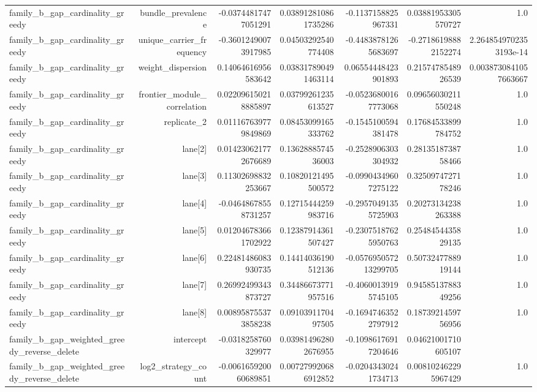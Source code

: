 {\begin{longtable}{lrrrrrr}
family\_b\_gap\_cardinality\_greedy & bundle\_prevalence & -0.03744817477051291 & 0.038912810861735286 & -0.1137158825967331 & 0.03881953305570727 & 1.0 \\
family\_b\_gap\_cardinality\_greedy & unique\_carrier\_frequency & -0.36012490073917985 & 0.04503292540774408 & -0.44838781265683697 & -0.27186198882152274 & 2.2648549702353193e-14 \\
family\_b\_gap\_cardinality\_greedy & weight\_dispersion & 0.14064616956583642 & 0.038317890491463114 & 0.06554448423901893 & 0.2157478548926539 & 0.0038730841057663667 \\
family\_b\_gap\_cardinality\_greedy & frontier\_module\_correlation & 0.022096150218885897 & 0.03799261235613527 & -0.05236800167773068 & 0.09656030211550248 & 1.0 \\
family\_b\_gap\_cardinality\_greedy & replicate\_2 & 0.011167639779849869 & 0.08453099165333762 & -0.1545100594381478 & 0.17684533899784752 & 1.0 \\
family\_b\_gap\_cardinality\_greedy & lane[2] & 0.014230621772676689 & 0.1362888574536003 & -0.2528906303304932 & 0.2813518738758466 & 1.0 \\
family\_b\_gap\_cardinality\_greedy & lane[3] & 0.11302698832253667 & 0.10820121495500572 & -0.09904349607275122 & 0.3250974727178246 & 1.0 \\
family\_b\_gap\_cardinality\_greedy & lane[4] & -0.04648678558731257 & 0.12715444259983716 & -0.29570491355725903 & 0.20273134238263388 & 1.0 \\
family\_b\_gap\_cardinality\_greedy & lane[5] & 0.012046783661702922 & 0.12387914361507427 & -0.23075187625950763 & 0.2548454435829135 & 1.0 \\
family\_b\_gap\_cardinality\_greedy & lane[6] & 0.22481486083930735 & 0.14414036190512136 & -0.057695057213299705 & 0.5073247788919144 & 1.0 \\
family\_b\_gap\_cardinality\_greedy & lane[7] & 0.26992499343873727 & 0.34486673771957516 & -0.40600139195745105 & 0.9458513788349256 & 1.0 \\
family\_b\_gap\_cardinality\_greedy & lane[8] & 0.008958755373858238 & 0.0910391170497505 & -0.16947463522797912 & 0.1873921459756956 & 1.0 \\
family\_b\_gap\_weighted\_greedy\_reverse\_delete & intercept & -0.0318258760329977 & 0.039814962802676955 & -0.10986176917204646 & 0.04621001710605107 &  \\
family\_b\_gap\_weighted\_greedy\_reverse\_delete & log2\_strategy\_count & -0.006165920060689851 & 0.007279920686912852 & -0.02043430241734713 & 0.008102462295967429 & 1.0 \\

\end{longtable}}

